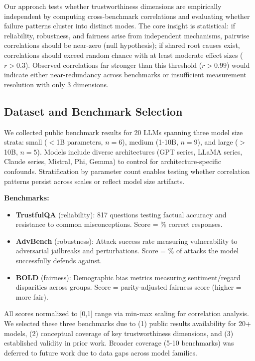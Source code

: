 Our approach tests whether trustworthiness dimensions are empirically independent by computing cross-benchmark correlations and evaluating whether failure patterns cluster into distinct modes. The core insight is statistical: if reliability, robustness, and fairness arise from independent mechanisms, pairwise correlations should be near-zero (null hypothesis); if shared root causes exist, correlations should exceed random chance with at least moderate effect sizes ($r > 0.3$). Observed correlations far stronger than this threshold ($r > 0.99$) would indicate either near-redundancy across benchmarks or insufficient measurement resolution with only 3 dimensions.

\subsection{Dataset and Benchmark Selection}

We collected public benchmark results for 20 LLMs spanning three model size strata: small ($<$1B parameters, $n=6$), medium (1-10B, $n=9$), and large ($>$10B, $n=5$). Models include diverse architectures (GPT series, LLaMA series, Claude series, Mistral, Phi, Gemma) to control for architecture-specific confounds. Stratification by parameter count enables testing whether correlation patterns persist across scales or reflect model size artifacts.

\textbf{Benchmarks:}
\begin{itemize}
\item \textbf{TrustfulQA} (reliability): 817 questions testing factual accuracy and resistance to common misconceptions. Score = \% correct responses.
\item \textbf{AdvBench} (robustness): Attack success rate measuring vulnerability to adversarial jailbreaks and perturbations. Score = \% of attacks the model successfully defends against.
\item \textbf{BOLD} (fairness): Demographic bias metrics measuring sentiment/regard disparities across groups. Score = parity-adjusted fairness score (higher = more fair).
\end{itemize}

All scores normalized to [0,1] range via min-max scaling for correlation analysis. We selected these three benchmarks due to (1) public results availability for 20+ models, (2) conceptual coverage of key trustworthiness dimensions, and (3) established validity in prior work. Broader coverage (5-10 benchmarks) was deferred to future work due to data gaps across model families.

